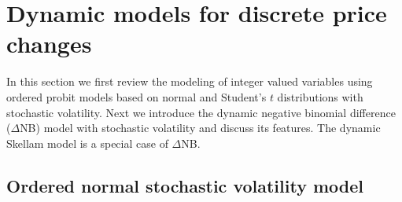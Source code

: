 \documentclass[12pt]{article}
\begin{document}


\section{Dynamic models for discrete price changes}
\label{c_sec:model}

In this section we first review the modeling of
integer valued variables using ordered probit models
based on normal and Student's $t$ distributions
with stochastic volatility.
Next we introduce the dynamic negative binomial difference
($\Delta$NB) model with stochastic volatility and discuss
its features. The dynamic Skellam model is a special case of
$\Delta$NB.

\subsection{Ordered normal stochastic volatility model}\label{c_sec:ordern}
\end{document}
